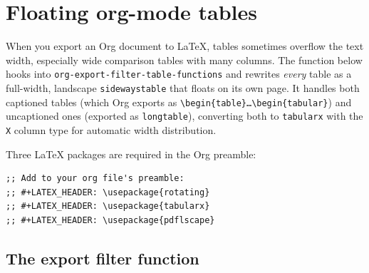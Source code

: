 \chapter{Floating org-mode tables}
\label{app:floating-org-tables}

When you export an Org document to \LaTeX, tables sometimes overflow
the text width, especially wide comparison tables with many columns.
The function below hooks into \texttt{org-export-filter-table-functions}
and rewrites \emph{every} table as a full-width, landscape
\texttt{sidewaystable} that floats on its own page.  It handles both
captioned tables (which Org exports as
\texttt{\textbackslash begin\{table\}\dots\textbackslash begin\{tabular\}})
and uncaptioned ones (exported as \texttt{longtable}), converting both
to \texttt{tabularx} with the \texttt{X} column type for automatic
width distribution.

\medskip
\noindent
Three \LaTeX{} packages are required in the Org preamble:

\begin{verbatim}
;; Add to your org file's preamble:
;; #+LATEX_HEADER: \usepackage{rotating}
;; #+LATEX_HEADER: \usepackage{tabularx}
;; #+LATEX_HEADER: \usepackage{pdflscape}
\end{verbatim}

\section{The export filter function}

